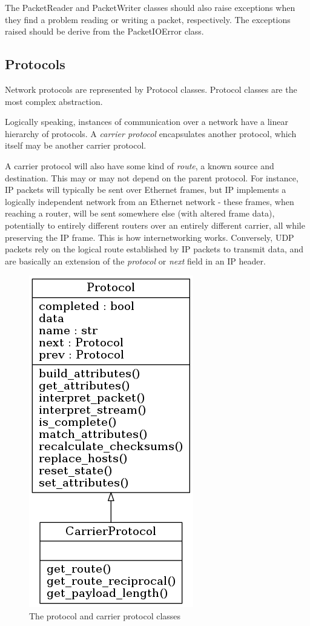 \documentclass[10pt,a4paper,notitlepage,twoside]{report}
\begin{document}
The PacketReader and PacketWriter classes should also raise exceptions when they find a problem reading or writing a packet, respectively. The exceptions raised should be derive from the PacketIOError class.

\subsection{Protocols}
\label{sec:desproto}
Network protocols are represented by Protocol classes. Protocol classes are the most complex abstraction.

Logically speaking, instances of communication over a network have a linear hierarchy of protocols. A \emph{carrier protocol} encapsulates another protocol, which itself may be another carrier protocol.

A carrier protocol will also have some kind of \emph{route}, a known source and destination. This may or may not depend  on the parent protocol. For instance, IP packets will typically be sent over Ethernet frames, but IP implements a logically independent network from an Ethernet network - these frames, when reaching a router, will be sent somewhere else (with altered frame data), potentially to entirely different routers over an entirely different carrier, all while preserving the IP frame. This is how internetworking works. Conversely, UDP packets rely on the logical route established by IP packets to transmit data, and are basically an extension of the \emph{protocol} or \emph{next} field in an IP header.

\begin{figure}[H]
\center
\includegraphics[scale=0.7]{diagrams/protocol.png}
\caption{The protocol and carrier protocol classes}
\end{figure}
\end{document}
